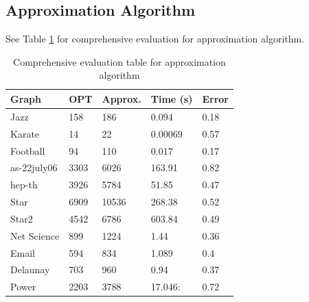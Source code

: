 \subsection{Approximation Algorithm}
See Table \ref{tab1} for comprehensive evaluation for approximation algorithm.
\begin{table}[htb]
\caption{Comprehensive evaluation table for approximation algorithm}
\label{tab1}
\begin{minipage}{\columnwidth}
\begin{center}
\begin{tabular}{@{}lllll@{}}
\toprule
Graph        & OPT  & Approx. & Time (s) & Error \\ \midrule
Jazz         & 158  & 186     & 0.094    & 0.18  \\
Karate       & 14   & 22      & 0.00069  & 0.57  \\
Football     & 94   & 110     & 0.017    & 0.17  \\
as-22july06 & 3303 & 6026    & 163.91    & 0.82  \\
hep-th       & 3926 & 5784    & 51.85    & 0.47  \\
Star         & 6909 & 10536   & 268.38    & 0.52  \\
Star2        & 4542 & 6786    & 603.84   & 0.49  \\
Net Science  & 899  & 1224    & 1.44     & 0.36  \\
Email        & 594  & 834     & 1.089     & 0.4   \\
Delaunay     & 703  & 960     & 0.94     & 0.37  \\
Power        & 2203 & 3788    & 17.046:    & 0.72  \\ \bottomrule
\end{tabular}
\end{center}
\end{minipage}
\end{table}

